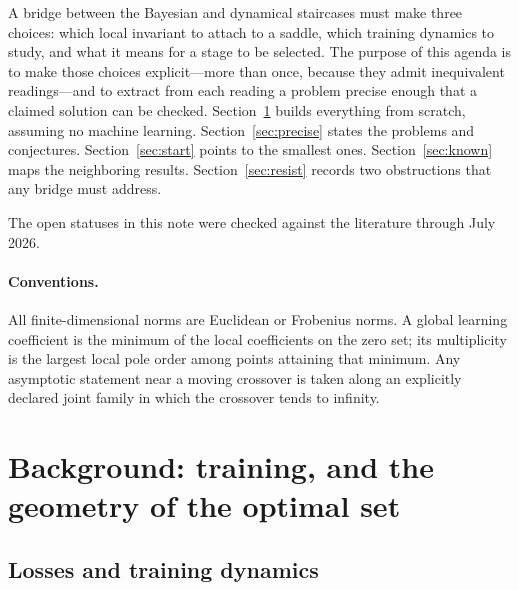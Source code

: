 \documentclass[11pt]{amsart}
\theoremstyle{plain}
\theoremstyle{definition}
\begin{document}
A bridge between the Bayesian and dynamical staircases must make three choices: which local invariant to attach to a saddle, which training dynamics to study, and what it means for a stage to be selected. The purpose of this agenda is to make those choices explicit---more than once, because they admit inequivalent readings---and to extract from each reading a problem precise enough that a claimed solution can be checked. Section~\ref{sec:background} builds everything from scratch, assuming no machine learning. Section~\ref{sec:precise} states the problems and conjectures. Section~\ref{sec:start} points to the smallest ones. Section~\ref{sec:known} maps the neighboring results. Section~\ref{sec:resist} records two obstructions that any bridge must address.

The open statuses in this note were checked against the literature through July 2026.

\paragraph{Conventions.}
All finite-dimensional norms are Euclidean or Frobenius norms. A global learning coefficient is the minimum of the local coefficients on the zero set; its multiplicity is the largest local pole order among points attaining that minimum. Any asymptotic statement near a moving crossover is taken along an explicitly declared joint family in which the crossover tends to infinity.

\section{Background: training, and the geometry of the optimal set}\label{sec:background}

\subsection{Losses and training dynamics}\label{sec:losses}
\end{document}
